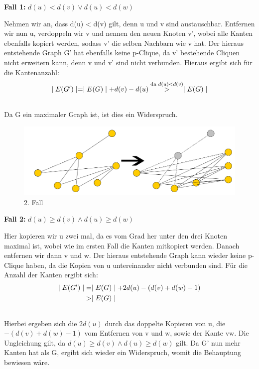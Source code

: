 \documentclass[12pt, a4paper]{article}
\begin{document}
\textbf{Fall 1:} $d(u) < d(v) \vee d(u) < d(w)$

Nehmen wir an, dass d(u) \textless{} d(v) gilt, denn u und v sind austauschbar.
Entfernen wir nun u, verdoppeln wir v und nennen den neuen Knoten v', wobei alle Kanten ebenfalls kopiert werden, sodass v' die selben Nachbarn wie v hat. Der hieraus entstehende Graph G' hat ebenfalls keine p-Clique, da v' bestehende Cliquen nicht erweitern kann, denn v und v' sind nicht verbunden. Hieraus ergibt sich für die Kantenanzahl:
\begin{gather}
\begin{split}\mid E(G') \mid = \mid E(G) \mid + d(v) - d(u) \overset{\text{da } d(u) < d(v)}{>} \mid E(G) \mid\end{split}\notag\\\begin{split}\end{split}\notag
\end{gather}
Da G ein maximaler Graph ist, ist dies ein Widerspruch.


\begin{figure}[H] 
		\centering
		\includegraphics[page=1, width=\textwidth]{assets/proof5-case2}
		\caption{2. Fall} 
\end{figure}

\textbf{Fall 2:} $d(u) \ge d(v) \wedge d(u) \ge d(w)$

Hier kopieren wir u zwei mal, da es vom Grad her unter den drei Knoten maximal ist, wobei wie im ersten Fall die Kanten mitkopiert werden. Danach entfernen wir dann v und w. Der hieraus entstehende Graph kann wieder keine p-Clique haben, da die Kopien von u untereinander nicht verbunden sind. Für die Anzahl der Kanten ergibt sich:
\begin{gather}
\begin{split}\mid E(G') \mid &= \mid E(G) \mid + 2 d(u) - (d(v) + d(w) - 1) \\
&> \mid E(G) \mid\end{split}\notag\\\begin{split}\end{split}\notag
\end{gather}
Hierbei ergeben sich die $2d(u)$ durch das doppelte Kopieren von u, die $- (d(v) + d(w) - 1)$ vom Entfernen von v und w, sowie der Kante vw. Die Ungleichung gilt, da $d(u) \ge d(v) \wedge d(u) \ge d(w)$ gilt. Da G' nun mehr Kanten hat als G, ergibt sich wieder ein Widerspruch, womit die Behauptung bewiesen wäre.
\newpage
\end{document}
